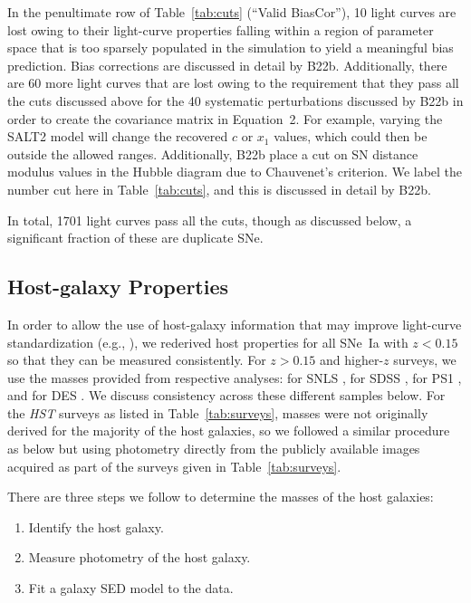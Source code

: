 \documentclass[twocolumn]{aastex63}
\begin{document}
In the penultimate row of Table~\ref{tab:cuts} (``Valid BiasCor''), 10 light curves are lost owing to their light-curve properties falling within a region of parameter space that is too sparsely populated in the simulation to yield a meaningful bias prediction. Bias corrections are discussed in detail by B22b. Additionally, there are 60 more light curves that are lost owing to the requirement that they pass all the cuts discussed above for the 40 systematic perturbations discussed by B22b in order to create the covariance matrix in Equation~2. For example, varying the SALT2 model will change the recovered $c$ or $x_1$ values, which could then be outside the allowed ranges. Additionally, B22b place a cut on SN distance modulus values in the Hubble diagram due to Chauvenet's criterion.  We label the number cut here in Table~\ref{tab:cuts}, and this is discussed in detail by B22b.

In total, 1701 light curves pass all the cuts, though as discussed below, a significant fraction of these are duplicate SNe. 




\subsection{Host-galaxy Properties}
\label{hostmass}

In order to allow the use of host-galaxy information that may improve light-curve standardization (e.g., \citealp{Sullivan10,Kelly10,lampeitl10,Popovic21}), we rederived host properties for all SNe~Ia with $z<0.15$ so that they can be measured consistently.  For $z>0.15$ and higher-$z$ surveys, we use the masses provided from respective analyses: for SNLS \citet{Betoule2014}, for SDSS \citet{Sako2018}, for PS1 \citet{Scolnic2018}, and for DES \citet{Smith2020}.  We discuss consistency across these different samples below.  For the \textit{HST} surveys as listed in Table~\ref{tab:surveys}, masses were not originally derived for the majority of the host galaxies, so we followed a similar procedure as below but using photometry directly from the publicly available images acquired as part of the surveys given in Table~\ref{tab:surveys}.


There are three steps we follow to  determine the masses of the host galaxies:

\begin{enumerate}
\item Identify the host galaxy.
\item Measure photometry of the host galaxy.
\item Fit a galaxy SED model to the data.
\end{enumerate}
\end{document}

